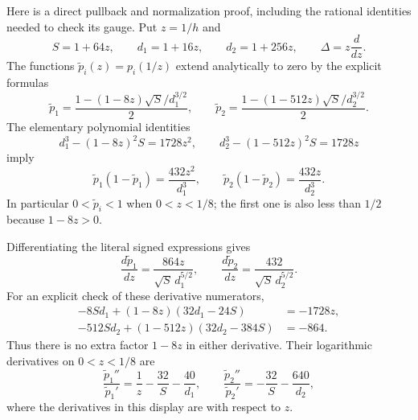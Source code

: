 \documentclass[11pt,a4paper]{article}
\begin{document}
Here is a direct pullback and normalization proof, including the
rational identities needed to check its gauge.  Put $z=1/h$ and
\[
 S=1+64z,\qquad d_1=1+16z,\qquad d_2=1+256z,
 \qquad \Delta=z\frac{d}{dz}.
\]
The functions $\widetilde p_i(z)=p_i(1/z)$ extend analytically to zero
by the explicit formulas
\begin{equation}\label{eq:gauss-z-parameters}
 \widetilde p_1=\frac{1-(1-8z)\sqrt S/d_1^{3/2}}2,
 \qquad
 \widetilde p_2=\frac{1-(1-512z)\sqrt S/d_2^{3/2}}2.
\end{equation}
The elementary polynomial identities
\begin{equation}\label{eq:gauss-z-discriminants}
 d_1^3-(1-8z)^2S=1728z^2,
 \qquad d_2^3-(1-512z)^2S=1728z
\end{equation}
imply
\[
 \widetilde p_1(1-\widetilde p_1)=\frac{432z^2}{d_1^3},
 \qquad
 \widetilde p_2(1-\widetilde p_2)=\frac{432z}{d_2^3}.
\]
In particular $0<\widetilde p_i<1$ when $0<z<1/8$; the first one is
also less than $1/2$ because $1-8z>0$.

Differentiating the literal signed expressions gives
\begin{equation}\label{eq:gauss-corrected-z-derivatives}
 \frac{d\widetilde p_1}{dz}=\frac{864z}{\sqrt S\,d_1^{5/2}},
 \qquad
 \frac{d\widetilde p_2}{dz}=\frac{432}{\sqrt S\,d_2^{5/2}}.
\end{equation}
For an explicit check of these derivative numerators,
\[
\begin{aligned}
 -8Sd_1+(1-8z)(32d_1-24S)&=-1728z,\\
 -512Sd_2+(1-512z)(32d_2-384S)&=-864.
\end{aligned}
\]
Thus there is no extra factor $1-8z$ in either derivative.  Their
logarithmic derivatives on $0<z<1/8$ are
\begin{equation}\label{eq:gauss-z-log-derivatives}
 \frac{\widetilde p_1''}{\widetilde p_1'}
     =\frac1z-\frac{32}{S}-\frac{40}{d_1},
 \qquad
 \frac{\widetilde p_2''}{\widetilde p_2'}
     =-\frac{32}{S}-\frac{640}{d_2},
\end{equation}
where the derivatives in this display are with respect to $z$.
\end{document}
